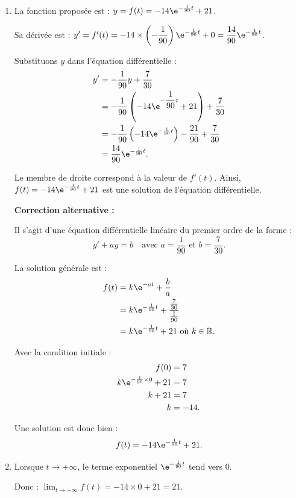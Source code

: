 \bigskip

\begin{enumerate}[start=2]
\item La fonction proposée est :
$y = f(t) = -14\e^{-\frac{1}{90}t} + 21$.

Sa dérivée est :
$y' = f'(t) = -14 \times \left(-\dfrac{1}{90}\right)\e^{-\frac{1}{90}t} + 0 = \dfrac{14}{90}\e^{-\frac{1}{90}t}$.

Substituons $y$ dans l'équation différentielle :
\begin{align*}
y' &= -\dfrac{1}{90}y + \dfrac{7}{30} \\
&= -\dfrac{1}{90}\left(-14\e^{-\dfrac{1}{90}t} + 21\right) + \dfrac{7}{30} \\
&= -\dfrac{1}{90}\left(-14\e^{-\frac{1}{90}t}\right) - \dfrac{21}{90} + \dfrac{7}{30} \\
&= \dfrac{14}{90}\e^{-\frac{1}{90}t}.
\end{align*}

Le membre de droite correspond à la valeur de $f'(t)$. Ainsi, $f(t) = -14\e^{-\frac{1}{90}t} + 21$ est une solution de l'équation différentielle.

\textbf{Correction alternative :}

Il s'agit d'une équation différentielle linéaire du premier ordre de la forme :
\[y' + ay = b \quad \text{avec } a = \dfrac{1}{90} \text{ et } b = \dfrac{7}{30}.\]

La solution générale est :
\begin{align*}
f(t) &= k\e^{-at} + \dfrac{b}{a} \\
&= k\e^{-\frac{1}{90}t} + \dfrac{\frac{7}{30}}{\frac{1}{90}} \\
&= k\e^{-\frac{1}{90}t} + 21 \text{ où } k \in \mathbb{R}.
\end{align*}

Avec la condition initiale :
\begin{align*}
f(0) &= 7 \\
k\e^{-\frac{1}{90}\times0} + 21 &= 7 \\
k + 21 &= 7 \\
k &= -14.
\end{align*}

Une solution est donc bien :
\[f(t) = -14\e^{-\frac{1}{90}t} + 21.\]

\item Lorsque $t \to +\infty$, le terme exponentiel $\e^{-\frac{1}{90}t}$ tend vers 0.

Donc : $\displaystyle\lim_{t \to +\infty} f(t) = -14 \times 0 + 21 = 21.$


\end{enumerate}
